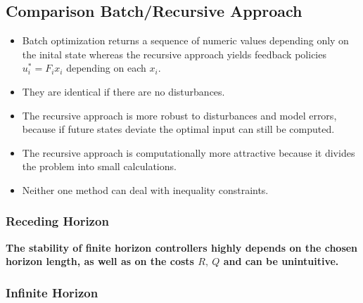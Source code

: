 \documentclass[8pt,a4paper]{scrartcl}
\begin{document}
\begin{multicols*}{3}


\subsection{Comparison Batch/Recursive Approach}

\begin{itemize}
\ncompaq
\item Batch optimization returns a sequence of numeric values depending only on the inital state whereas the recursive approach yields feedback policies $u_i^\ast=F_ix_i$ depending on each $x_i$.
\item They are identical if there are no disturbances.
\item The recursive approach is more robust to disturbances and model errors, because if future states deviate the optimal input can still be computed.
\item The recursive approach is computationally more attractive because it divides the problem into small calculations.
\item Neither one method can deal with inequality constraints.
\end{itemize}

\subsubsection{Receding Horizon}



\textbf{The stability of finite horizon controllers highly depends on the chosen horizon length, as well as on the costs $R,\ Q$ and can be unintuitive.}


\subsubsection{Infinite Horizon}



\end{multicols*}
\end{document}
